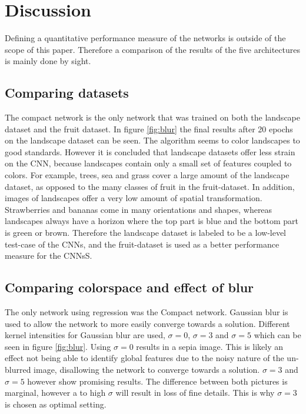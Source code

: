 \section{Discussion}

Defining a quantitative performance measure of the networks is outside of the scope of this paper. Therefore a comparison of the results of the five architectures is mainly done by sight.

\subsection{Comparing datasets}
The compact network is the only network that was trained on both the landscape dataset and the fruit dataset. In figure \ref{fig:blur} the final results after 20 epochs on the landscape dataset can be seen. The algorithm seems to color landscapes to good standards. However it is concluded that landscape datasets offer less strain on the CNN, because landscapes contain only a small set of features coupled to colors. For example, trees, sea and grass cover a large amount of the landscape dataset, as opposed to the many classes of fruit in the fruit-dataset. In addition, images of landscapes offer a very low amount of spatial transformation. Strawberries and bananas come in many orientations and shapes, whereas landscapes always have a horizon where the top part is blue and the bottom part is green or brown. Therefore the landscape dataset is labeled to be a low-level test-case of the CNNs, and the fruit-dataset is used as a better performance measure for the CNNsS.

\subsection{Comparing colorspace and effect of blur}
The only network using regression was the Compact network. Gaussian blur is used to allow the network to more easily converge towards a solution. Different kernel intensities for Gaussian blur are used, $\sigma = 0$, $\sigma = 3$ and $\sigma = 5$ which can be seen in figure \ref{fig:blur}. Using $\sigma = 0 $ results in a sepia image. This is likely an effect not being able to identify global features due to the noisy nature of the un-blurred image, disallowing the network to converge towards a solution. $\sigma = 3$ and $\sigma = 5$ however show promising results. The difference between both pictures is marginal, however a to high $\sigma$ will result in loss of fine details. This is why $\sigma = 3$ is chosen as optimal setting.

